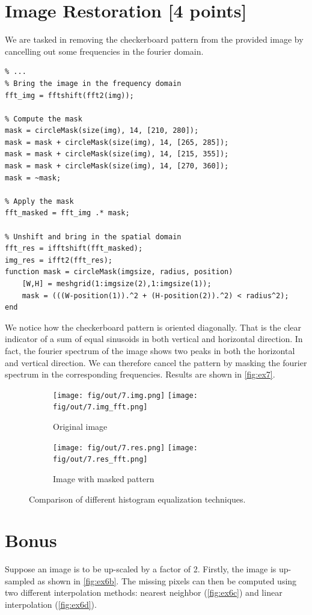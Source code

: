 \documentclass[tikz,14pt,fleqn]{article}
\begin{document}
\section{Image Restoration [4 points]}
We are tasked in removing the checkerboard pattern from the provided image by cancelling out some frequencies in the fourier domain.
\begin{verbatim} 
% ...
% Bring the image in the frequency domain
fft_img = fftshift(fft2(img));

% Compute the mask
mask = circleMask(size(img), 14, [210, 280]);
mask = mask + circleMask(size(img), 14, [265, 285]);
mask = mask + circleMask(size(img), 14, [215, 355]);
mask = mask + circleMask(size(img), 14, [270, 360]);
mask = ~mask;

% Apply the mask
fft_masked = fft_img .* mask;

% Unshift and bring in the spatial domain
fft_res = ifftshift(fft_masked);
img_res = ifft2(fft_res);
function mask = circleMask(imgsize, radius, position)
    [W,H] = meshgrid(1:imgsize(2),1:imgsize(1));
    mask = (((W-position(1)).^2 + (H-position(2)).^2) < radius^2);
end
\end{verbatim}
We notice how the checkerboard pattern is oriented diagonally. That is the clear indicator of a sum of equal sinusoids in both vertical and horizontal direction. In fact, the fourier spectrum of the image shows two peaks in both the horizontal and vertical direction. We can therefore cancel the pattern by masking the fourier spectrum in the corresponding frequencies. Results are shown in \autoref{fig:ex7}.
\begin{figure}[h!]
    \centering
    \begin{subfigure}{0.27\textwidth}
        \centering
        \texttt{[image: fig/out/7.img.png]}
        \texttt{[image: fig/out/7.img\_fft.png]}
        \caption{Original image}
    \end{subfigure}
    \begin{subfigure}{0.27\textwidth}
        \centering
        \texttt{[image: fig/out/7.res.png]}
        \texttt{[image: fig/out/7.res\_fft.png]}
        \caption{Image with masked pattern}
    \end{subfigure}
    \caption{Comparison of different histogram equalization techniques.}
    \label{fig:ex7}
\end{figure}


\section{Bonus}
Suppose an image is to be up-scaled by a factor of 2.
Firstly, the image is up-sampled as shown in \autoref{fig:ex6b}. The missing pixels can then be computed using two different interpolation methods: nearest neighbor (\autoref{fig:ex6c}) and linear interpolation (\autoref{fig:ex6d}).
\end{document}
